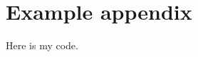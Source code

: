 %
%

\chapter{Example appendix}

Here is my code.

\begin{singlespacing} 
\begin{small}
\end{small}
\end{singlespacing}
